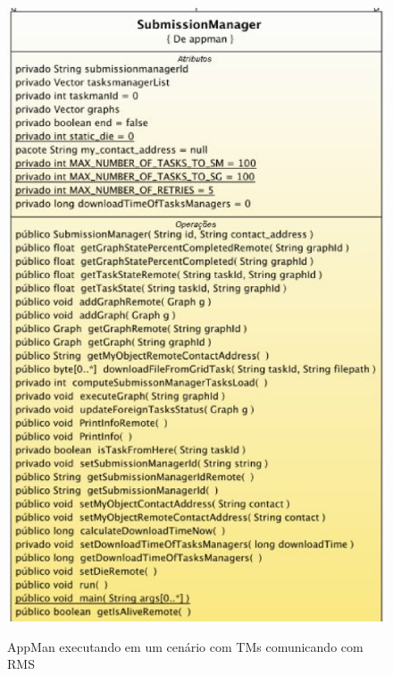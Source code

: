 \begin{figure}[h]
\center
\includegraphics[scale=.5]{img/SubmissionManager.eps}
\label{AppManRMS}
\caption{AppMan executando em um cenário com TMs comunicando com RMS}
\end{figure}
